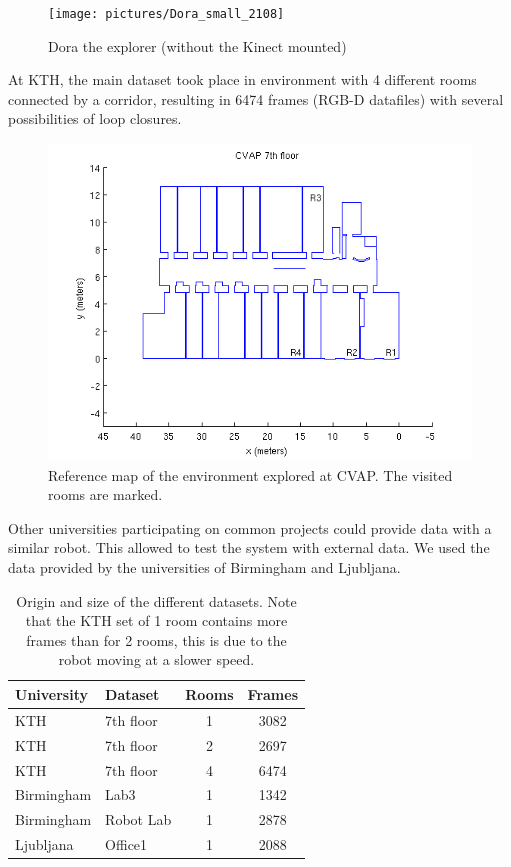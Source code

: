 \begin{figure}[h]
 \begin{center}
 \texttt{[image: pictures/Dora\_small\_2108]}
 \end{center}
\caption{Dora the explorer (without the Kinect mounted)}
\end{figure}

At \gls{KTH}, the main dataset took place in environment with 4 different rooms connected by a corridor, resulting in 6474 frames (RGB-D datafiles) with several possibilities of loop closures. 

\begin{figure}[H]
\centering
\includegraphics[width=1\textwidth]{figures/cvap_7th}
\caption{Reference map of the environment explored at CVAP. The visited rooms are marked.}
\end{figure}

Other universities participating on common projects could provide data with a similar robot. This allowed to test the system with external data. We used the data provided by the universities of Birmingham and Ljubljana.

\begin{table}[H]
 \begin{center}
  \begin{tabular}{llcc}
  \hline
  University & Dataset & Rooms & Frames \\
  \hline
  KTH & 7th floor & 1 & 3082 \\
  KTH & 7th floor & 2 & 2697 \\
  KTH & 7th floor & 4 & 6474 \\
  Birmingham & Lab3 & 1 & 1342 \\
  Birmingham & Robot Lab & 1 & 2878 \\
  Ljubljana & Office1 & 1 & 2088 \\
  \hline
  \end{tabular}
 \end{center}
 \caption{Origin and size of the different datasets. Note that the KTH set of 1 room contains more frames than for 2 rooms, this is due to the robot moving at a slower speed.}
\end{table}

